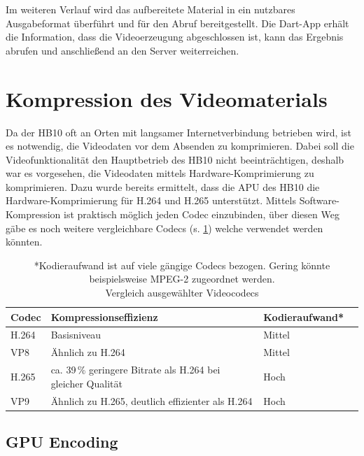 Im weiteren Verlauf wird das aufbereitete Material in ein nutzbares Ausgabeformat überführt und für den Abruf bereitgestellt. Die Dart-App erhält die Information, dass die Videoerzeugung abgeschlossen ist, kann das Ergebnis abrufen und anschließend an den Server weiterreichen.

\section{Kompression des Videomaterials}

Da der HB10 oft an Orten mit langsamer Internetverbindung betrieben wird, ist es notwendig, die Videodaten vor dem Absenden zu komprimieren.
Dabei soll die Videofunktionalität den Hauptbetrieb des HB10 nicht beeinträchtigen, deshalb war es vorgesehen, die Videodaten mittels Hardware-Komprimierung zu komprimieren. Dazu wurde bereits ermittelt, dass die APU des HB10 die Hardware-Komprimierung für H.264 und H.265 unterstützt.
Mittels Software-Kompression ist praktisch möglich jeden Codec einzubinden, über diesen Weg gäbe es noch weitere vergleichbare Codecs (s. \cref{tab:codec_vergleich}) welche verwendet werden könnten.

\begin{table}[ht] 
    \centering 
    \begin{tabular}{|l|l|l|l|} 
        \hline 
        \textbf{Codec} & \textbf{Kompressionseffizienz} & \textbf{Kodieraufwand}* \\ 
        \hline 
        H.264 & Basisniveau & Mittel \\ 
        \hline 
        VP8 & Ähnlich zu H.264 & Mittel \\ 
        \hline 
        H.265 & ca. 39\,\% geringere Bitrate als H.264 bei gleicher Qualität & Hoch \\ 
        \hline 
        VP9 & Ähnlich zu H.265, deutlich effizienter als H.264 & Hoch \\
        \hline 
    \end{tabular} 
    \caption{*Kodieraufwand ist auf viele gängige Codecs bezogen. Gering könnte beispielsweise MPEG-2 zugeordnet werden.\\Vergleich ausgewählter Videocodecs \cite{Grois2013, webm_vp8}}
    \label{tab:codec_vergleich} 
\end{table}

\subsection{GPU Encoding} \label{sec:gpu}

